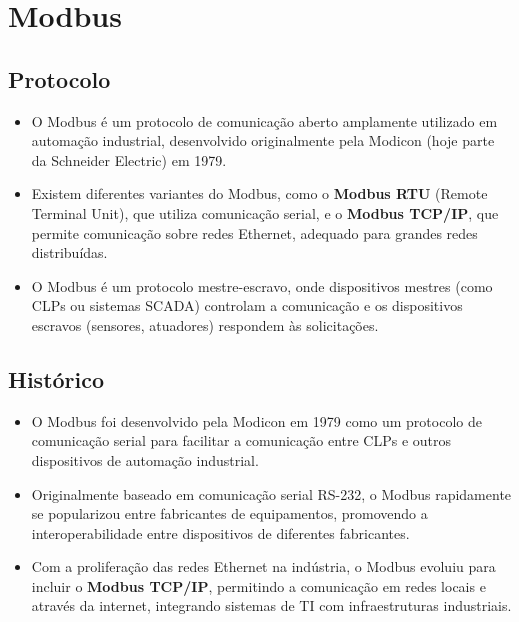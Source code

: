 \documentclass[a4paper,11pt]{article} %
\begin{document}
\section{Modbus}

\subsection{Protocolo}
\begin{itemize}
    \item O Modbus é um protocolo de comunicação aberto amplamente utilizado em automação industrial, desenvolvido originalmente pela Modicon (hoje parte da Schneider Electric) em 1979.
    \item Existem diferentes variantes do Modbus, como o \textbf{Modbus RTU} (Remote Terminal Unit), que utiliza comunicação serial, e o \textbf{Modbus TCP/IP}, que permite comunicação sobre redes Ethernet, adequado para grandes redes distribuídas.
    \item O Modbus é um protocolo mestre-escravo, onde dispositivos mestres (como CLPs ou sistemas SCADA) controlam a comunicação e os dispositivos escravos (sensores, atuadores) respondem às solicitações.
\end{itemize}

\subsection{Histórico}
\begin{itemize}
    \item O Modbus foi desenvolvido pela Modicon em 1979 como um protocolo de comunicação serial para facilitar a comunicação entre CLPs e outros dispositivos de automação industrial.
    \item Originalmente baseado em comunicação serial RS-232, o Modbus rapidamente se popularizou entre fabricantes de equipamentos, promovendo a interoperabilidade entre dispositivos de diferentes fabricantes.
    \item Com a proliferação das redes Ethernet na indústria, o Modbus evoluiu para incluir o \textbf{Modbus TCP/IP}, permitindo a comunicação em redes locais e através da internet, integrando sistemas de TI com infraestruturas industriais.
\end{itemize}
\end{document}

